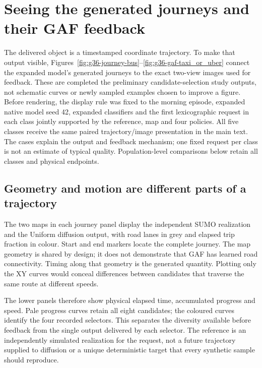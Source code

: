 \FloatBarrier
\section{Seeing the generated journeys and their GAF feedback}
\label{sec:g36-visual}

The delivered object is a timestamped coordinate trajectory. To make that output visible, Figures~\ref{fig:g36-journey-bus}--\ref{fig:g36-gaf-taxi_or_uber} connect the expanded model's generated journeys to the exact two-view images used for feedback. These are completed the preliminary candidate-selection study outputs, not schematic curves or newly sampled examples chosen to improve a figure. Before rendering, the display rule was fixed to the morning episode, expanded native model seed 42, expanded classifiers and the first lexicographic request in each class jointly supported by the reference, map and four policies. All five classes receive the same paired trajectory/image presentation in the main text. The cases explain the output and feedback mechanism; one fixed request per class is not an estimate of typical quality. Population-level comparisons below retain all classes and physical endpoints.

\subsection{Geometry and motion are different parts of a trajectory}
The two maps in each journey panel display the independent SUMO realization and the Uniform diffusion output, with road lanes in grey and elapsed trip fraction in colour. Start and end markers locate the complete journey. The map geometry is shared by design; it does not demonstrate that GAF has learned road connectivity. Timing along that geometry is the generated quantity. Plotting only the XY curves would conceal differences between candidates that traverse the same route at different speeds.

The lower panels therefore show physical elapsed time, accumulated progress and speed. Pale progress curves retain all eight candidates; the coloured curves identify the four recorded selectors. This separates the diversity available before feedback from the single output delivered by each selector. The reference is an independently simulated realization for the request, not a future trajectory supplied to diffusion or a unique deterministic target that every synthetic sample should reproduce.


